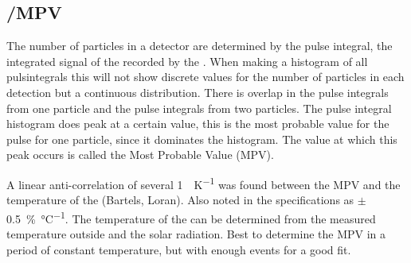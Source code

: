 \subsection{\mip/MPV}

The number of particles in a detector are determined by the pulse
integral, the integrated signal of the \pmt recorded by the \adc. When
making a histogram of all pulsintegrals this will not show discrete
values for the number of particles in each detection but a continuous
distribution. There is overlap in the pulse integrals from one particle
and the pulse integrals from two particles. The pulse integral histogram
does peak at a certain value, this is the most probable value for the
pulse for one particle, since it dominates the histogram. The value at
which this peak occurs is called the Most Probable Value (MPV).

A linear anti-correlation of several \SI{1}{\adc\per\kelvin} was found
between the MPV and the temperature of the \pmt (Bartels, Loran). Also
noted in the specifications as $\pm$
\SI{.5}{\percent\per\degreeCelsius}. The temperature of the \pmt can be
determined from the measured temperature outside and the solar
radiation. Best to determine the MPV in a period of constant
temperature, but with enough events for a good fit.
